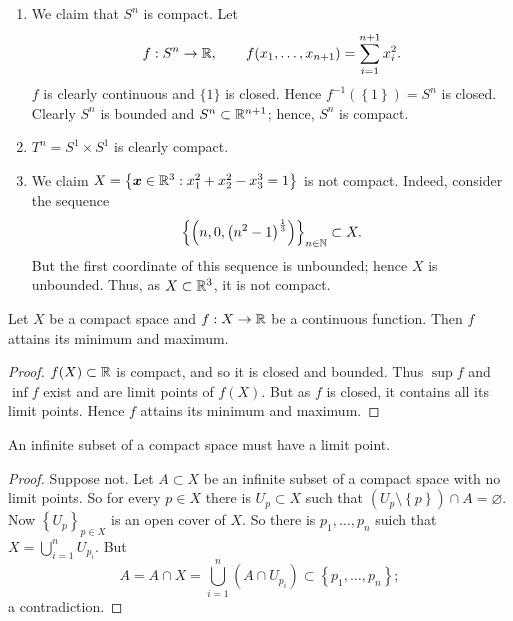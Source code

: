 \begin{examples}
	\begin{enumerate}
		\item
			We claim that $S^n$ is compact.
			Let
			\[
				f: S^n \to \mathbb{R}, \qquad
				f(x_1, \ldots, x_{n+1})
				= \sum^{n+1}_{i=1} x_i^2.
			\]
			$f$ is clearly continuous and $\{1\}$ is closed.
			Hence
			$
				f^{-1}\left( 
					\left\{
						1
					\right\} 
				\right) = S^n
			$
			is closed.
			Clearly $S^n$ is bounded and $S^n \subset \mathbb{R}^{n+1}$;
			hence, $S^n$ is compact.

		\item
			$T^n = S^1 \times S^1$ is clearly compact.

		\item
			We claim
			$
				X = \left\{
					\bm x \in \mathbb{R}^3:
					x_1^2 + x_2^2 - x_3^3 = 1
				\right\}
			$
			is not compact.
			Indeed, consider the sequence
			\[
				\left\{
					\left( 
						n,0,\left( 
							n^2 - 1 
						\right)^{\frac13} 
					\right)
				\right\}_{n \in \mathbb{N}}
				\subset X.
			\]
			But the first coordinate of this sequence is unbounded;
			hence $X$ is unbounded.
			Thus, as $X \subset \mathbb{R}^3$, it is not compact.
	\end{enumerate}
\end{examples}

\begin{corollary}
	Let $X$ be a compact space and $f: X \to \mathbb{R}$ be a continuous function.
	Then $f$ attains its minimum and maximum.
\end{corollary}

\begin{proof}
	$f(X) \subset \mathbb{R}$ is compact, and so it is closed and bounded.
	Thus $\sup f$ and $\inf f$ exist and are limit points of $f(X)$.
	But as $f$ is closed, it contains all its limit points.
	Hence $f$ attains its minimum and maximum.
\end{proof}

\begin{theorem}
	An infinite subset of a compact space must have a limit point.
\end{theorem}

\begin{proof}
	Suppose not.
	Let $A \subset X$ be an infinite subset of a compact space with no limit
	points.
	So for every $p \in X$ there is $U_p \subset X$ such that
	$
	\left( 
		U_p \setminus \left\{
			p
		\right\} 
	\right)
	\cap A = \varnothing.
	$
	Now
	$
		\left\{
			U_p
		\right\}_{p \in X}
	$
	is an open cover of $X$.
	So there is $p_1, \ldots, p_n$ suich that
	$
		X = \bigcup_{i=1}^n U_{p_i}.
	$
	But
	\[
		A
		= A \cap X
		= \bigcup_{i=1}^n (A \cap U_{p_i})
		\subset \left\{
			p_1, \ldots, p_n
		\right\};
	\]
	a contradiction.
\end{proof}

